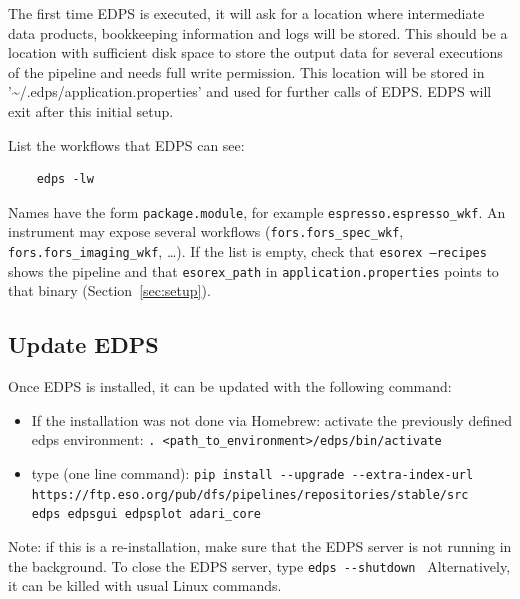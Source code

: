 The first time EDPS is executed, it will ask for a location where intermediate data products, bookkeeping information and logs will be stored. This should be a location with sufficient disk space to store the output data for several executions of the pipeline and needs full write permission. This location will be stored in '\textasciitilde/.edps/application.properties' and used for further calls of EDPS. EDPS will exit after this initial setup. 

List the workflows that EDPS can see:

\begin{verbatim}
    edps -lw
\end{verbatim}

Names have the form {\tt package.module}, for example {\tt espresso.espresso\_wkf}. An instrument may expose several workflows ({\tt fors.fors\_spec\_wkf}, {\tt fors.fors\_imaging\_wkf}, \ldots). If the list is empty, check that {\tt esorex --recipes} shows the pipeline and that {\tt esorex\_path} in {\tt application.properties} points to that binary (Section~\ref{sec:setup}).



\subsection{Update EDPS}
Once  EDPS is installed, it can be updated with the following command:
\begin{itemize}

\item If the installation was not done via Homebrew: activate the previously defined edps environment:\newline
{\tt . <path\_to\_environment>/edps/bin/activate}
\item type (one line command):\newline
\verb |pip install --upgrade --extra-index-url |\newline
\verb |  https://ftp.eso.org/pub/dfs/pipelines/repositories/stable/src | \newline
\verb|  edps edpsgui edpsplot adari_core|
\end{itemize}


Note: if this is a re-installation, make sure that the EDPS server is not running in the background. To close the EDPS server, type 
\verb|edps --shutdown |
Alternatively, it can be killed with usual Linux commands.
